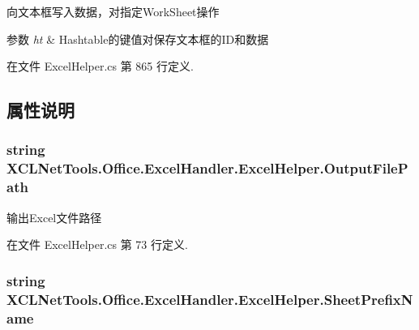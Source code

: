 向文本框写入数据，对指定\-Work\-Sheet操作 


\begin{DoxyParams}{参数}
{\em ht} & Hashtable的键值对保存文本框的\-I\-D和数据\\
\hline
\end{DoxyParams}


在文件 Excel\-Helper.\-cs 第 865 行定义.



\subsection{属性说明}
\hypertarget{class_x_c_l_net_tools_1_1_office_1_1_excel_handler_1_1_excel_helper_a208fdf6acc1a32a42377d798020aeee3}{
\subsubsection[{Output\-File\-Path}]{\setlength{\rightskip}{0pt plus 5cm}string X\-C\-L\-Net\-Tools.\-Office.\-Excel\-Handler.\-Excel\-Helper.\-Output\-File\-Path\hspace{0.3cm}{\ttfamily [set]}}}\label{class_x_c_l_net_tools_1_1_office_1_1_excel_handler_1_1_excel_helper_a208fdf6acc1a32a42377d798020aeee3}


输出\-Excel文件路径 



在文件 Excel\-Helper.\-cs 第 73 行定义.

\hypertarget{class_x_c_l_net_tools_1_1_office_1_1_excel_handler_1_1_excel_helper_afa37d1f7b1b3cbb06dcacffc908fbcb6}{
\subsubsection[{Sheet\-Prefix\-Name}]{\setlength{\rightskip}{0pt plus 5cm}string X\-C\-L\-Net\-Tools.\-Office.\-Excel\-Handler.\-Excel\-Helper.\-Sheet\-Prefix\-Name\hspace{0.3cm}{\ttfamily [set]}}}\label{class_x_c_l_net_tools_1_1_office_1_1_excel_handler_1_1_excel_helper_afa37d1f7b1b3cbb06dcacffc908fbcb6}


